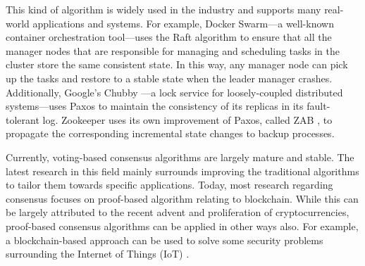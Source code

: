 \documentclass[12pt, a4paper]{article}
\begin{document}
This kind of algorithm is widely used in the industry and supports many real-world applications and systems. For example, Docker Swarm---a well-known container orchestration tool---uses the Raft algorithm to ensure that all the manager nodes that are responsible for managing and scheduling tasks in the cluster store the same consistent state. In this way, any manager node can pick up the tasks and restore to a stable state when the leader manager crashes. Additionally, Google's Chubby \cite{burrows2006chubby}---a lock service for loosely-coupled distributed systems---uses Paxos to maintain the consistency of its replicas in its fault-tolerant log. Zookeeper uses its own improvement of Paxos, called ZAB
\cite{junqueira2011zab}, to propagate the corresponding incremental state changes to backup processes.

Currently, voting-based consensus algorithms are largely mature and stable. The latest research in this field mainly surrounds improving the traditional algorithms to tailor them towards specific applications. Today, most research regarding consensus focuses on proof-based algorithm relating to blockchain. While this can be largely attributed to the recent advent and proliferation of cryptocurrencies, proof-based consensus algorithms can be applied in other ways also. For example, a blockchain-based approach can be used to solve some security problems surrounding the Internet of Things (IoT) \cite{zhang2020blockchain}.



\end{document}
